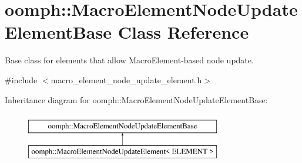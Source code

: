 \hypertarget{classoomph_1_1MacroElementNodeUpdateElementBase}{}\section{oomph\+:\+:Macro\+Element\+Node\+Update\+Element\+Base Class Reference}
\label{classoomph_1_1MacroElementNodeUpdateElementBase}


Base class for elements that allow Macro\+Element-\/based node update.  




{\ttfamily \#include $<$macro\+\_\+element\+\_\+node\+\_\+update\+\_\+element.\+h$>$}

Inheritance diagram for oomph\+:\+:Macro\+Element\+Node\+Update\+Element\+Base\+:\begin{figure}[H]
\begin{center}
\leavevmode
\includegraphics[height=2.000000cm]{classoomph_1_1MacroElementNodeUpdateElementBase}
\end{center}
\end{figure}
